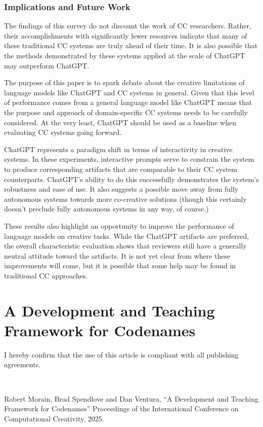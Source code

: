 \documentclass[phd,electronic,oneside,twosidetoc,letterpaper,chaptercenter,parttop,lof]{byumsphd}
\begin{document}
\subsection{Implications and Future Work}
The findings of this survey do not discount the work of CC researchers. 
Rather, their accomplishments with significantly fewer resources indicate that many of these traditional CC systems are truly ahead of their time.
It is also possible that the methods demonstrated by these systems applied at the scale of ChatGPT may outperform ChatGPT.

The purpose of this paper is to spark debate about the creative limitations of language models like ChatGPT and CC systems in general. 
Given that this level of performance comes from a general language model like ChatGPT means that the purpose and approach of domain-specific CC systems needs to be carefully considered. At the very least, ChatGPT should be used as a baseline when evaluating CC systems going forward.

ChatGPT represents a paradigm shift in terms of interactivity in creative systems. 
In these experiments, interactive prompts serve to constrain the system to produce corresponding artifacts that are comparable to their CC system counterparts. 
ChatGPT's ability to do this successfully demonstrates the system's robustness and ease of use. It also suggests a possible move away from fully autonomous systems towards more co-creative solutions (though this certainly doesn't preclude fully autonomous systems in any way, of course.)

These results also highlight an opportunity to improve the performance of language models on creative tasks.
While the ChatGPT artifacts are preferred, the overall characteristic evaluation shows that reviewers still have a generally neutral attitude toward the artifacts. 
It is not yet clear from where these improvements will come, but it is possible that some help may be found in traditional CC approaches. 




\chapter{A Development and Teaching Framework for Codenames} 
\label{codenames} 

I hereby confirm that the use of this article is compliant with all publishing agreements.

\

\noindent
Robert Morain, Brad Spendlove and Dan Ventura, ``A Development and Teaching Framework for Codenames'' Proceedings of the International Conference on Computational Creativity, 2025.
\end{document}
